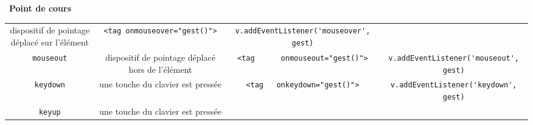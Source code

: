 \documentclass[
  11pt,
]{article}
\newcommand{\passthrough}[1]{#1}
\newcounter{cours}
\newenvironment{cours}[1]
{\par \medskip   \addtocounter{cours}{1} \noindent  
\begin{bclogo}[arrondi =0.1,  ombre = true, barre=none, logo=\bcbook, marge=4]{~\textbf{Point de cours} \textbf{\thecours} {\itshape #1} }  \par}
{
\end{bclogo}
 \par \bigskip }
\begin{document}
\begin{cours}{}
\begin{longtable}[]{@{}cccc@{}}
\begin{minipage}[t]{0.22\columnwidth}
dispositif de pointage déplacé sur l'élément\strut
\end{minipage} & \begin{minipage}[t]{0.22\columnwidth}\centering
\passthrough{\lstinline!<tag onmouseover="gest()">!}\strut
\end{minipage} & \begin{minipage}[t]{0.22\columnwidth}\centering
\passthrough{\lstinline!v.addEventListener('mouseover', gest)!}\strut
\end{minipage}\tabularnewline
\begin{minipage}[t]{0.22\columnwidth}\centering
\passthrough{\lstinline!mouseout!}\strut
\end{minipage} & \begin{minipage}[t]{0.22\columnwidth}\centering
dispositif de pointage déplacé hors de l'élément\strut
\end{minipage} & \begin{minipage}[t]{0.22\columnwidth}\centering
\passthrough{\lstinline!<tag      onmouseout="gest()">!}\strut
\end{minipage} & \begin{minipage}[t]{0.22\columnwidth}\centering
\passthrough{\lstinline!v.addEventListener('mouseout', gest)!}\strut
\end{minipage}\tabularnewline
\begin{minipage}[t]{0.22\columnwidth}\centering
\passthrough{\lstinline!keydown!}\strut
\end{minipage} & \begin{minipage}[t]{0.22\columnwidth}\centering
une touche du clavier est pressée\strut
\end{minipage} & \begin{minipage}[t]{0.22\columnwidth}\centering
\passthrough{\lstinline!<tag   onkeydown="gest()">!}\strut
\end{minipage} & \begin{minipage}[t]{0.22\columnwidth}\centering
\passthrough{\lstinline!v.addEventListener('keydown', gest)!}\strut
\end{minipage}\tabularnewline
\begin{minipage}[t]{0.22\columnwidth}\centering
\passthrough{\lstinline!keyup!}\strut
\end{minipage} & \begin{minipage}[t]{0.22\columnwidth}\centering
une touche du clavier est pressée\strut
\end{minipage} & \begin{minipage}[t]{0.22\columnwidth}\centering

\end{minipage}
\end{longtable}
\end{cours}
\end{document}
